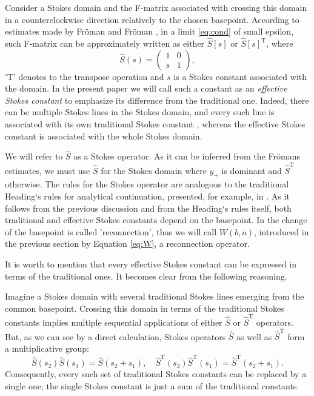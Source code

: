 \documentclass[atmp]{ipart_v1}
\def\S{\widehat{S}}
\def\T{\mathrm{T}}
\newcommand\eref[1]{\eqref{#1}}
\newcommand\Eref[1]{Equation \ref{#1}}
\begin{document}
Consider a Stokes domain and the F-matrix associated with crossing this domain in a 
counterclockwise direction relatively to the chosen basepoint. According to estimates 
made by Fr\"oman and Fr\"oman \cite{frbook}, in a limit \eref{eq:cond} of small epsilon, 
such F-matrix can be approximately written as either $\S[s]$ or $\S[s]^{\T}$, where
\begin{equation}
\S(s) = \left(\begin{array}{*{2}{c}} 1 & 0 \\ s & 1 \end{array}\right),    
\end{equation}
'T' denotes to the transpose operation and $s$ is a Stokes constant associated with the domain. 
In the present paper we will call such a constant as an \textit{effective Stokes constant} 
to emphasize its difference from the traditional one. Indeed, there can be multiple Stokes 
lines in the Stokes domain, and every such line is associated with its own traditional Stokes 
constant \cite{heading, rwbook}, whereas the effective Stokes constant is associated with 
the whole Stokes domain.

We will refer to $\S$ as a Stokes operator. As it can be inferred from the Fr\"omans estimates,
we must use $\S$ for the Stokes domain where $y_+$ is dominant and $\S^{\T}$ otherwise. The rules
for the Stokes operator are analogous to the traditional Heading`s rules for analytical 
continuation, presented, for example, in \cite{heading, rwbook}. As it follows from the previous discussion
and from the Heading`s rules itself, both traditional and effective Stokes constants depend on the basepoint.
In \cite{heading, rwbook} the change of the basepoint is called 'reconnection', thus we will
call $W(b,a)$, introduced in the previous section by \Eref{eq:W}, a reconnection operator.

It is worth to mention that every effective Stokes constant can be expressed in terms of the
traditional ones. It becomes clear from the following reasoning.

Imagine a Stokes domain with several traditional Stokes lines 
emerging from the common basepoint. Crossing this domain in terms of the traditional Stokes constants
implies multiple sequential applications of either $\S$ or $\S^{\T}$ operators. 
But, as we can see by a direct calculation, Stokes operators $\S$ as well as $\S^{\T}$ 
form a multiplicative group:
\begin{equation}
\S(s_2)\S(s_1) = \S(s_2 + s_1), \quad
\S^{\T}(s_2)\S^{\T}(s_1) = \S^{\T}(s_2 + s_1).
\end{equation}
Consequently, every such set of traditional Stokes constants can be replaced by a single one;
the single Stokes constant is just a sum of the traditional constants.
\end{document}
